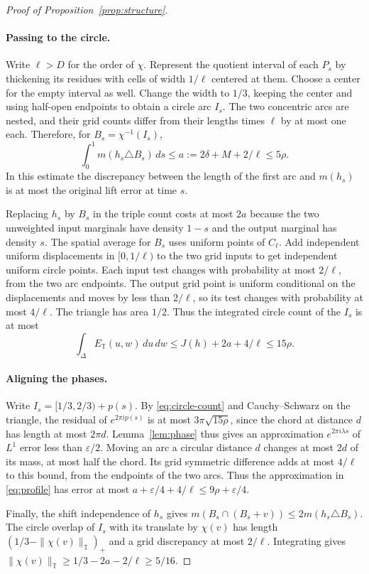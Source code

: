 \documentclass[11pt,reqno]{amsart}
\newcommand{\T}{\mathbb T}
\numberwithin{equation}{section}
\begin{document}
\begin{proof}[Proof of Proposition~\ref{prop:structure}]
\paragraph{Passing to the circle.}
Write \(\ell>D\) for the order of \(\chi\). Represent the quotient
interval of each \(P_s\) by thickening its residues with cells of
width \(1/\ell\) centered at them. Choose a center for the empty
interval as well. Change the width to \(1/3\), keeping the center
and using half-open endpoints to obtain a circle arc \(I_s\).
The two concentric arcs are nested, and their grid counts differ
from their lengths times \(\ell\) by at most one each. Therefore,
for \(B_s=\chi^{-1}(I_s)\),
\[
 \int_0^1 m(h_s\triangle B_s)\,ds\le
 a:=2\delta+M+2/\ell\le 5\rho .
\]
In this estimate the discrepancy between the length of the
first arc and \(m(h_s)\) is at most the original lift error at
time \(s\).

Replacing \(h_s\) by \(B_s\) in the triple count costs at most \(2a\)
because the two unweighted input marginals have density \(1-s\)
and the output marginal has density \(s\). The spatial average for
\(B_s\) uses uniform points of \(C_\ell\). Add independent uniform
displacements in \([0,1/\ell)\) to the two grid inputs to get
independent uniform circle points. Each input test changes with
probability at most \(2/\ell\), from the two arc endpoints. The
output grid point is uniform conditional on the displacements
and moves by less than \(2/\ell\), so its test changes with
probability at most \(4/\ell\). The triangle has area \(1/2\).
Thus the integrated circle count of the \(I_s\) is at most
\[
 \int_\Delta E_{\T}(u,w)\,du\,dw\le J(h)+2a+4/\ell\le15\rho .
\]
\paragraph{Aligning the phases.}
Write \(I_s=[1/3,2/3)+p(s)\). By \eqref{eq:circle-count} and
Cauchy--Schwarz on the triangle, the residual of \(e^{2\pi i p(s)}\)
is at most \(3\pi\sqrt{15\rho}\), since the chord at distance \(d\)
has length at most \(2\pi d\). Lemma~\ref{lem:phase} thus gives
an approximation \(e^{2\pi i\lambda s}\) of \(L^1\) error
less than \(\varepsilon/2\). Moving an arc a circular distance
\(d\) changes at most \(2d\) of its mass, at most half the chord.
Its grid symmetric difference adds at most \(4/\ell\) to this bound,
from the endpoints of the two arcs. Thus the approximation in
\eqref{eq:profile} has error at most \(a+\varepsilon/4+4/\ell
\le9\rho+\varepsilon/4\).

Finally, the shift independence of \(h_s\) gives
\(m(B_s\cap(B_s+v))\le 2m(h_s\triangle B_s)\).
The circle overlap of \(I_s\) with its translate by \(\chi(v)\)
has length \((1/3-\|\chi(v)\|_\T)_+\) and a grid discrepancy
at most \(2/\ell\). Integrating gives
\(\|\chi(v)\|_\T\ge1/3-2a-2/\ell\ge5/16\).
\end{proof}
\end{document}
